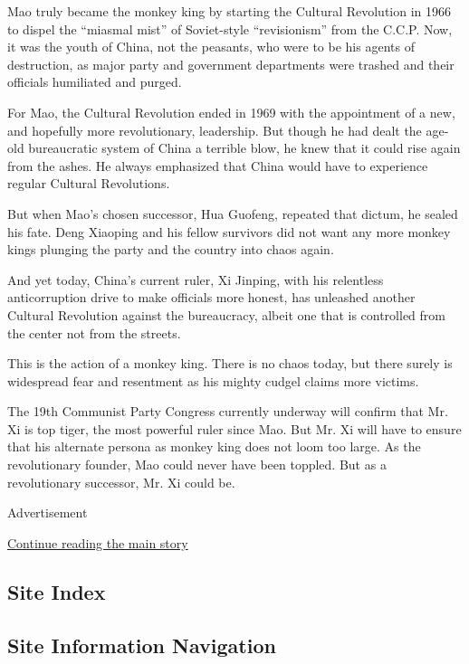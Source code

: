 Mao truly became the monkey king by starting the Cultural Revolution in
1966 to dispel the ``miasmal mist'' of Soviet-style ``revisionism'' from
the C.C.P. Now, it was the youth of China, not the peasants, who were to
be his agents of destruction, as major party and government departments
were trashed and their officials humiliated and purged.

For Mao, the Cultural Revolution ended in 1969 with the appointment of a
new, and hopefully more revolutionary, leadership. But though he had
dealt the age-old bureaucratic system of China a terrible blow, he knew
that it could rise again from the ashes. He always emphasized that China
would have to experience regular Cultural Revolutions.

But when Mao's chosen successor, Hua Guofeng, repeated that dictum, he
sealed his fate. Deng Xiaoping and his fellow survivors did not want any
more monkey kings plunging the party and the country into chaos again.

And yet today, China's current ruler, Xi Jinping, with his relentless
anticorruption drive to make officials more honest, has unleashed
another Cultural Revolution against the bureaucracy, albeit one that is
controlled from the center not from the streets.

This is the action of a monkey king. There is no chaos today, but there
surely is widespread fear and resentment as his mighty cudgel claims
more victims.

The 19th Communist Party Congress currently underway will confirm that
Mr. Xi is top tiger, the most powerful ruler since Mao. But Mr. Xi will
have to ensure that his alternate persona as monkey king does not loom
too large. As the revolutionary founder, Mao could never have been
toppled. But as a revolutionary successor, Mr. Xi could be.

Advertisement

\protect\hyperlink{after-bottom}{Continue reading the main story}

\hypertarget{site-index}{%
\subsection{Site Index}\label{site-index}}

\hypertarget{site-information-navigation}{%
\subsection{Site Information
Navigation}\label{site-information-navigation}}

